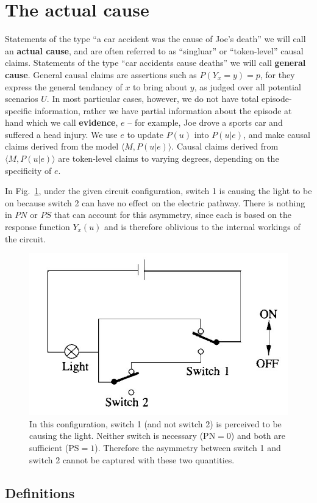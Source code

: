 \documentclass[11pt]{article}
\numberwithin{equation}{section}
\begin{document}
\section{The actual cause}
Statements of the type ``a car accident was the cause of Joe's death'' we will call an \textbf{actual cause}, and are often referred to as ``singluar'' or ``token-level'' causal claims. Statements of the type ``car accidents cause deaths'' we will call \textbf{general cause}. General causal claims are assertions such as $P(Y_x=y)=p$, for they express the general tendancy of $x$ to bring about $y$, as judged over all potential scenarios $U$. In most particular cases, however, we do not have total episode-specific information, rather we have partial information about the episode at hand which we call \textbf{evidence}, $e$ -- for example, Joe drove a sports car and suffered a head injury. We use $e$ to update $P(u)$ into $P(u|e)$, and make causal claims derived from the model $\langle M, P(u|e) \rangle$. Causal claims derived from $\langle M, P(u|e) \rangle$ are token-level claims to varying degrees, depending on the specificity of $e$.

In Fig.~\ref{Fig:actual-cause-circuit}, under the given circuit configuration, switch 1 is causing the light to be on because switch 2 can have no effect on the electric pathway. There is nothing in $PN$ or $PS$ that can account for this asymmetry, since each is based on the response function $Y_x(u)$ and is therefore oblivious to the internal workings of the circuit.

\begin{figure}
\begin{center}
\includegraphics[width=0.4\columnwidth]{figures/actual-cause-circuit.jpg}  
\end{center}
\caption{In this configuration, switch 1 (and not switch 2) is perceived to be causing the light. Neither switch is necessary (PN$=0$) and both are sufficient (PS$=1$). Therefore the asymmetry between switch 1 and switch 2 cannot be captured with these two quantities.}
\label{Fig:actual-cause-circuit}
\end{figure}

\subsection{Definitions}
\end{document}
